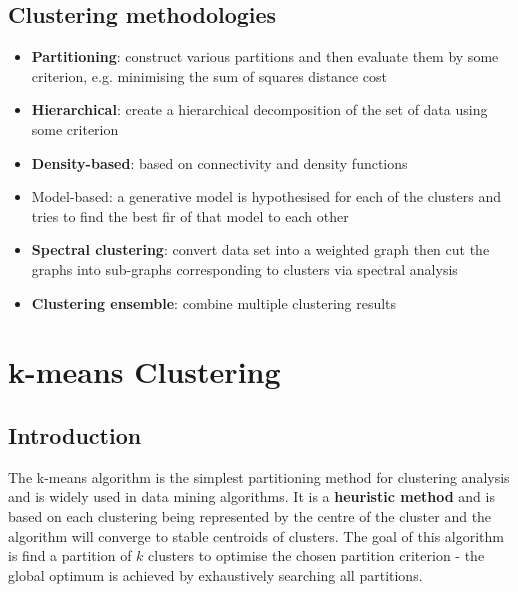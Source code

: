 \documentclass[11pt,fleqn]{book} %
\begin{document}
\section{Clustering methodologies}
\begin{itemize}
	\item \textbf{Partitioning}: construct various partitions and then evaluate them by some criterion, e.g. minimising the sum of squares distance cost
	\item \textbf{Hierarchical}: create a hierarchical decomposition of the set of data using some criterion
	\item \textbf{Density-based}: based on connectivity and density functions
	\item Model-based: a generative model is hypothesised for each of the clusters and tries to find the best fir of that model to each other
	\item \textbf{Spectral clustering}: convert data set into a weighted graph then cut the graphs into sub-graphs corresponding to clusters via spectral analysis
	\item \textbf{Clustering ensemble}: combine multiple clustering results
\end{itemize}



\chapter{k-means Clustering}

\section*{Introduction}
The k-means algorithm is the simplest partitioning method for clustering analysis and is widely used in data mining algorithms. It is a \textbf{heuristic method} and is based on each clustering being represented by the centre of the cluster and the algorithm will converge to stable centroids of clusters. The goal of this algorithm is find a partition of $k$ clusters to optimise the chosen partition criterion - the global optimum is achieved by exhaustively searching all partitions.
\end{document}

